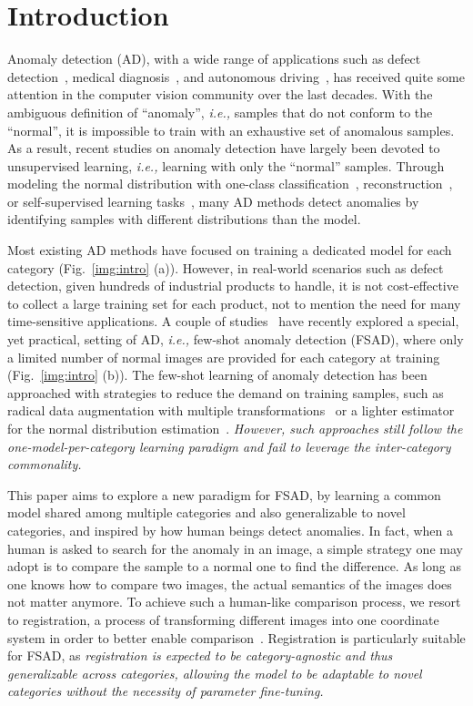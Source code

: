 \documentclass[runningheads]{llncs}
\begin{document}
\section{Introduction}
Anomaly detection (AD), with a wide range of applications such as defect detection~\cite{matsubara2018anomaly}, medical diagnosis~\cite{zhang2020viral}, and autonomous driving~\cite{eykholt2018robust}, has received quite some attention in the computer vision community over the last decades. With the ambiguous definition of ``anomaly'', \emph{i.e.,} samples that do not conform to the ``normal'', it is impossible to train with an exhaustive set of anomalous samples. As a result, recent studies on anomaly detection have largely been devoted to unsupervised learning, \emph{i.e.,} learning with only the ``normal'' samples. Through modeling the normal distribution with one-class classification~\cite{scholkopf2001estimating,ruff2018deep,yi2020patch}, reconstruction~\cite{zong2018deep,gong2019memorizing,metaformer,huang2022esad}, or self-supervised learning tasks~\cite{golan2018deep,ARNet,MKD,focus}, many AD methods detect anomalies by identifying samples with different distributions than the model.

Most existing AD methods have focused on training a dedicated model for each category (Fig.~\ref{img:intro} (a)). However, in real-world scenarios such as defect detection, given hundreds of industrial products to handle, it is not cost-effective to collect a large training set for each product, not to mention the need for many time-sensitive applications. A couple of studies~\cite{TDG,DiffNet} have recently explored a special, yet practical, setting of AD, \emph{i.e.,} few-shot anomaly detection (FSAD), where only a limited number of normal images are provided for each category at training (Fig.~\ref{img:intro} (b)). The few-shot learning of anomaly detection has been approached with strategies to reduce the demand on training samples, such as radical data augmentation with multiple transformations~\cite{TDG} or a lighter estimator for the normal distribution estimation~\cite{DiffNet}. \emph{However, such approaches still follow the one-model-per-category learning paradigm and fail to leverage the inter-category commonality.}

This paper aims to explore a new paradigm for FSAD, by learning a common model shared among multiple categories and also generalizable to novel categories, and inspired by how human beings detect anomalies. In fact, when a human is asked to search for the anomaly in an image, a simple strategy one may adopt is to compare the sample to a normal one to find the difference. As long as one knows how to compare two images, the actual semantics of the images does not matter anymore. To achieve such a human-like comparison process, we resort to registration, a process of transforming different images into one coordinate system in order to better enable comparison~\cite{brown1992survey,Barbara2003Image,peng2011brainaligner}. Registration is particularly suitable for FSAD, as \emph{registration is expected to be category-agnostic and thus generalizable across categories, allowing the model to be adaptable to novel categories without the necessity of parameter fine-tuning.}
\end{document}

